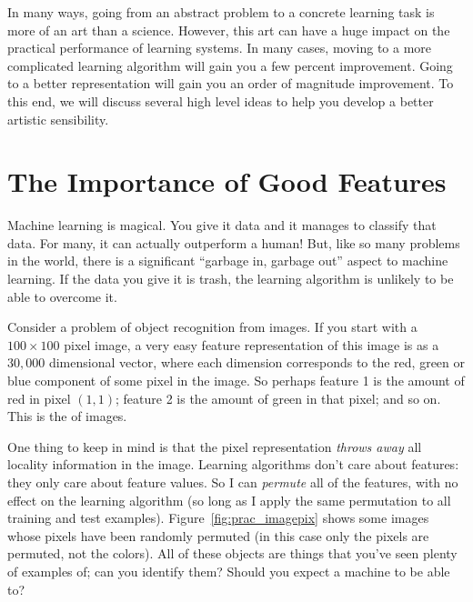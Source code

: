 In many ways, going from an abstract problem to a concrete learning
task is more of an art than a science.  However, this art can have a
huge impact on the practical performance of learning systems.  In many
cases, moving to a more complicated learning algorithm will gain you a
few percent improvement.  Going to a better representation will gain
you an order of magnitude improvement.  To this end, we will discuss
several high level ideas to help you develop a better artistic
sensibility.

\section{The Importance of Good Features}

Machine learning is magical.  You give it data and it manages to
classify that data.  For many, it can actually outperform a human!
But, like so many problems in the world, there is a significant
``garbage in, garbage out'' aspect to machine learning.  If the data
you give it is trash, the learning algorithm is unlikely to be able to
overcome it.

Consider a problem of object recognition from images.  If you start
with a $100 \times 100$ pixel image, a very easy feature
representation of this image is as a $30,000$ dimensional vector,
where each dimension corresponds to the red, green or blue component
of some pixel in the image.  So perhaps feature 1 is the amount of red
in pixel $(1,1)$; feature 2 is the amount of green in that pixel; and
so on.  This is the  of images.


One thing to keep in mind is that the pixel representation
\emph{throws away} all locality information in the image.  Learning
algorithms don't care about features: they only care about feature
values.  So I can \emph{permute} all of the features, with no effect
on the learning algorithm (so long as I apply the same permutation to
all training and test examples).  Figure~\ref{fig:prac_imagepix} shows
some images whose pixels have been randomly permuted (in this case only
the pixels are permuted, not the colors).  All of these objects are
things that you've seen plenty of examples of; can you identify them?
Should you expect a machine to be able to?


